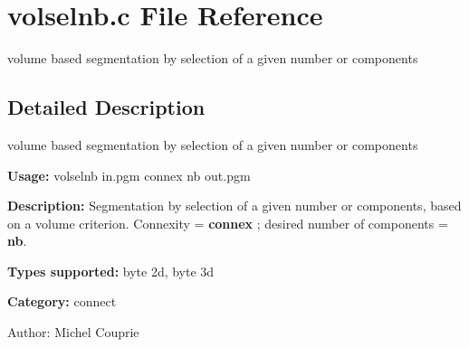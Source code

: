 \section{volselnb.c File Reference}
\label{volselnb_8c}
volume based segmentation by selection of a given number or components  




\label{_details}
\subsection{Detailed Description}
volume based segmentation by selection of a given number or components 

{\bf Usage:} volselnb in.pgm connex nb out.pgm

{\bf Description:} Segmentation by selection of a given number or components, based on a volume criterion. Connexity = {\bf connex} ; desired number of components = {\bf nb}.

{\bf Types supported:} byte 2d, byte 3d

{\bf Category:} connect

\begin{Desc}
\item[Author:]Michel Couprie \end{Desc}
